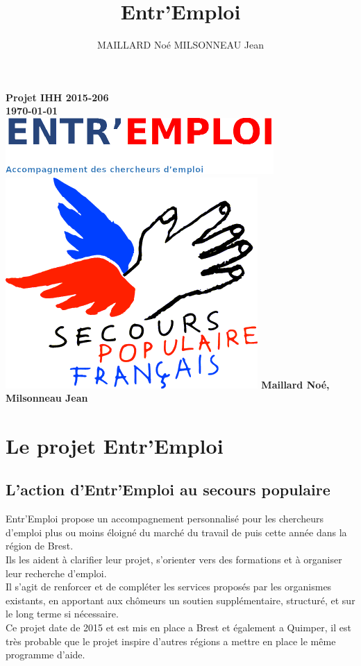 \documentclass[12pt]{report}
\title{Entr'Emploi}
\author{MAILLARD Noé MILSONNEAU Jean}
\begin{document}
\begin{titlepage}
	\thispagestyle{empty}
    \centering
    {\bfseries\Large
        Projet IHH 2015-206\\
        \today\\
        \vskip3cm
        \includegraphics{../../public/images/Logo-entremploi-md.png}
        \vskip15mm
        \includegraphics{../../public/images/Logo-spf.png}
        \vskip3cm
        Maillard Noé, Milsonneau Jean\\
    }    
    \normalsize
\end{titlepage}

\tableofcontents
 
\chapter{Le projet Entr'Emploi}
\thispagestyle{fancy}
\section{L'action d'Entr'Emploi au secours populaire}
Entr'Emploi propose un accompagnement personnalisé pour les chercheurs d'emploi plus ou moins éloigné du marché du travail de puis cette année dans la région de Brest.\\
Ils les aident à clarifier leur projet, s'orienter vers des formations et à organiser leur recherche d'emploi.\\
Il s'agit de renforcer et de compléter les services proposés par les organismes existants, en apportant aux chômeurs un soutien supplémentaire, structuré, et sur le long terme si nécessaire.\\
Ce projet date de 2015 et est mis en place a Brest et également a Quimper, il est très probable que le projet inspire d'autres régions a mettre en place le même programme d'aide.
\end{document}

